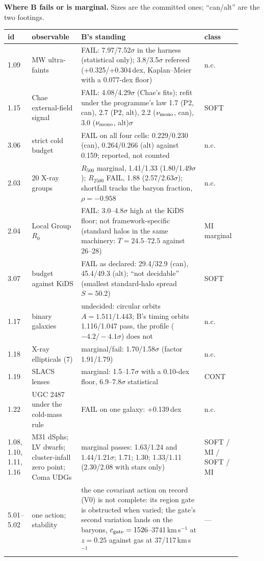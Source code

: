 \documentclass[10pt]{article}
\begin{document}
\textbf{Where B fails or is marginal.} Sizes are the committed ones; ``can/alt'' are the two footings.
\begin{center}\small
\begin{tabular}{p{0.06\linewidth}p{0.20\linewidth}p{0.50\linewidth}p{0.15\linewidth}}
\toprule
id & observable & B's standing & class \\
\midrule
1.09 & MW ultra-faints & FAIL: 7.97/7.52$\sigma$ in the harness (statistical only); 3.8/3.5$\sigma$ refereed (+0.325/+0.304\,dex, Kaplan--Meier with a 0.077-dex floor) & n.c. \\
1.15 & Chae external-field signal & FAIL: 4.08/4.29$\sigma$ (Chae's fits); refit under the programme's law 1.7 (P2, can), 2.7 (P2, alt), 2.2 ($\nu_{\rm mono}$, can), 3.0 ($\nu_{\rm mono}$, alt)$\sigma$ & SOFT \\
3.06 & strict cold budget & FAIL on all four cells: 0.229/0.230 (can), 0.264/0.266 (alt) against 0.159; reported, not counted & n.c. \\
2.03 & 20 X-ray groups & $R_{500}$ marginal, 1.41/1.33 (1.80/1.49$\sigma$); $R_{2500}$ FAIL, 1.88 (2.57/2.63$\sigma$); shortfall tracks the baryon fraction, $\rho=-0.958$ & n.c. \\
2.04 & Local Group $R_0$ & FAIL: 3.0--4.8$\sigma$ high at the KiDS floor; not framework-specific (standard halos in the same machinery: $T=24.5$--$72.5$ against 26--28) & MI marginal \\
3.07 & budget against KiDS & FAIL as declared: 29.4/32.9 (can), 45.4/49.3 (alt); ``not decidable'' (smallest standard-halo spread $S=50.2$) & SOFT \\
1.17 & binary galaxies & undecided: circular orbits $A=1.511/1.443$; B's timing orbits 1.116/1.047 pass, the profile ($-4.2/-4.1\sigma$) does not & n.c. \\
1.18 & X-ray ellipticals (7) & marginal/fail: 1.70/1.58$\sigma$ (factor 1.91/1.79) & n.c. \\
1.19 & SLACS lenses & marginal: 1.5--1.7$\sigma$ with a 0.10-dex floor, 6.9--7.8$\sigma$ statistical & CONT \\
1.22 & UGC 2487 under the cold-mass rule & FAIL on one galaxy: +0.139\,dex & n.c. \\
1.08, 1.10, 1.11, 1.16 & M31 dSphs; LV dwarfs; cluster-infall zero point; Coma UDGs & marginal passes: 1.63/1.24 and 1.44/1.21$\sigma$; 1.71; 1.30; 1.33/1.11 (2.30/2.08 with stars only) & SOFT / MI / SOFT / MI \\
5.01--5.02 & one action; stability & the one covariant action on record (V0) is not complete: its region gate is obstructed when varied; the gate's second variation lands on the baryons, $c_{\rm gate}=1526$--3741\,km\,s$^{-1}$ at $z=0.25$ against gas at 37/117\,km\,s$^{-1}$ & --- \\
\bottomrule
\end{tabular}
\end{center}
\end{document}
